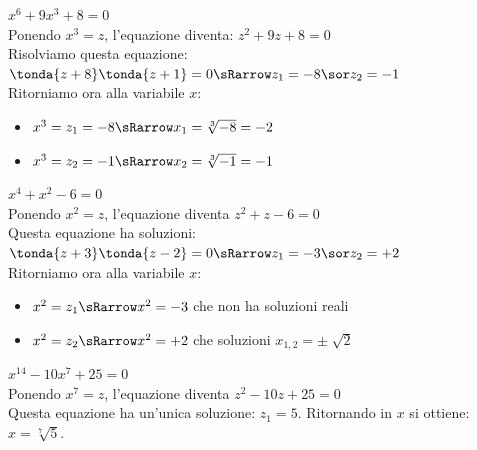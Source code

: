 \begin{esempio}
  $x^6+9x^3+8=0$
\\[4pt]
  Ponendo $x^3=z$, l'equazione diventa: $z^2+9z+8=0$
\\[4pt]
  Risolviamo questa equazione: 
  $\tonda{z+8}\tonda{z+1}=0 \sRarrow z_1=-8 \sor z_2=-1$
\\[4pt]
  Ritorniamo ora alla variabile $x$:
  \begin{itemize}
    \item $x^3=z_1=-8 \sRarrow x_1=\sqrt[3]{-8}=-2$ 
    \item $x^3=z_2=-1 \sRarrow x_2=\sqrt[3]{-1}=-1$
  \end{itemize}
\end{esempio}

\begin{esempio}
  $x^4+x^2-6=0$
  \\[4pt]
  Ponendo $x^2=z$, l'equazione diventa $z^2+z-6=0$ 
  \\[4pt]
  Questa equazione ha soluzioni:
  $\tonda{z+3}\tonda{z-2}=0 \sRarrow z_1=-3 \sor z_2=+2$
  \\[4pt]
  Ritorniamo ora alla variabile $x$:
  \begin{itemize}
    \item $x^2=z_1 \sRarrow x^2=-3$ che non ha soluzioni reali
    \item $x^2=z_2 \sRarrow x^2=+2$ che soluzioni $x_{1,2}=\pm \sqrt[]{2}$
  \end{itemize}
\end{esempio}

\begin{esempio}
  $x^{14}-10x^7+25=0$ 
  \\[4pt]
  Ponendo $x^7=z$, l'equazione diventa $z^2-10z+25=0$
  \\[4pt]
  Questa equazione ha un'unica soluzione: $z_1=5$. Ritornando in $x$ si ottiene: $x = \sqrt[7]{5}$.
\end{esempio}


